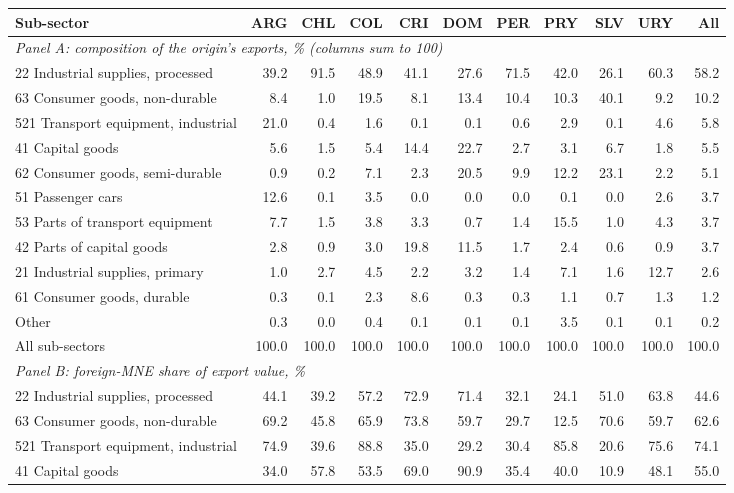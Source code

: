 \begin{tabular}{lrrrrrrrrrr}
\toprule
Sub-sector & ARG & CHL & COL & CRI & DOM & PER & PRY & SLV & URY & All \\
\midrule
\multicolumn{11}{l}{\textit{Panel A: composition of the origin's exports, \% (columns sum to 100)}} \\
22 Industrial supplies, processed & 39.2 & 91.5 & 48.9 & 41.1 & 27.6 & 71.5 & 42.0 & 26.1 & 60.3 & 58.2 \\
63 Consumer goods, non-durable & 8.4 & 1.0 & 19.5 & 8.1 & 13.4 & 10.4 & 10.3 & 40.1 & 9.2 & 10.2 \\
521 Transport equipment, industrial & 21.0 & 0.4 & 1.6 & 0.1 & 0.1 & 0.6 & 2.9 & 0.1 & 4.6 & 5.8 \\
41 Capital goods & 5.6 & 1.5 & 5.4 & 14.4 & 22.7 & 2.7 & 3.1 & 6.7 & 1.8 & 5.5 \\
62 Consumer goods, semi-durable & 0.9 & 0.2 & 7.1 & 2.3 & 20.5 & 9.9 & 12.2 & 23.1 & 2.2 & 5.1 \\
51 Passenger cars & 12.6 & 0.1 & 3.5 & 0.0 & 0.0 & 0.0 & 0.1 & 0.0 & 2.6 & 3.7 \\
53 Parts of transport equipment & 7.7 & 1.5 & 3.8 & 3.3 & 0.7 & 1.4 & 15.5 & 1.0 & 4.3 & 3.7 \\
42 Parts of capital goods & 2.8 & 0.9 & 3.0 & 19.8 & 11.5 & 1.7 & 2.4 & 0.6 & 0.9 & 3.7 \\
21 Industrial supplies, primary & 1.0 & 2.7 & 4.5 & 2.2 & 3.2 & 1.4 & 7.1 & 1.6 & 12.7 & 2.6 \\
61 Consumer goods, durable & 0.3 & 0.1 & 2.3 & 8.6 & 0.3 & 0.3 & 1.1 & 0.7 & 1.3 & 1.2 \\
Other & 0.3 & 0.0 & 0.4 & 0.1 & 0.1 & 0.1 & 3.5 & 0.1 & 0.1 & 0.2 \\
All sub-sectors & 100.0 & 100.0 & 100.0 & 100.0 & 100.0 & 100.0 & 100.0 & 100.0 & 100.0 & 100.0 \\
\midrule
\multicolumn{11}{l}{\textit{Panel B: foreign-MNE share of export value, \%}} \\
22 Industrial supplies, processed & 44.1 & 39.2 & 57.2 & 72.9 & 71.4 & 32.1 & 24.1 & 51.0 & 63.8 & 44.6 \\
63 Consumer goods, non-durable & 69.2 & 45.8 & 65.9 & 73.8 & 59.7 & 29.7 & 12.5 & 70.6 & 59.7 & 62.6 \\
521 Transport equipment, industrial & 74.9 & 39.6 & 88.8 & 35.0 & 29.2 & 30.4 & 85.8 & 20.6 & 75.6 & 74.1 \\
41 Capital goods & 34.0 & 57.8 & 53.5 & 69.0 & 90.9 & 35.4 & 40.0 & 10.9 & 48.1 & 55.0 \\

\end{tabular}
